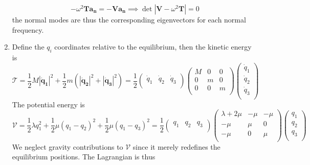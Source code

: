 \documentclass[a4paper]{article}
\begin{document}
\begin{ans}
\begin{enumerate}[label=(\roman*)]
$$-\omega^2\mathbf{Ta_n}=-\mathbf{Va_n}\implies\det|\mathbf{V}-\omega^2\mathbf{T}|=0$$
the normal modes are thus the corresponding eigenvectors for each normal frequency.
\item Define the $q_i$ coordinates relative to the equilibrium, then the kinetic energy is
$$\mathcal{T}=\frac{1}{2}M|\mathbf{\dot{q}_1}|^2+\frac{1}{2}m(|\mathbf{\dot{q}_2}|^2+|\mathbf{\dot{q}_3}|^2)=\frac{1}{2}\begin{pmatrix}\dot{q}_1&\dot{q}_2&\dot{q}_3\\\end{pmatrix}\begin{pmatrix}M&0&0\\0&m&0\\0&0&m\\\end{pmatrix}\begin{pmatrix}\dot{q}_1\\\dot{q}_2\\\dot{q}_3\\\end{pmatrix}$$
The potential energy is
$$\mathcal{V}=\frac{1}{2}\lambda q_1^2+\frac{1}{2}\mu(q_1-q_2)^2+\frac{1}{2}\mu(q_1-q_3)^2=\frac{1}{2}\begin{pmatrix}q_1&q_2&q_3\\\end{pmatrix}\begin{pmatrix}\lambda+2\mu&-\mu&-\mu\\-\mu&\mu&0\\-\mu&0&\mu\\\end{pmatrix}\begin{pmatrix}q_1\\q_2\\q_3\\\end{pmatrix}$$
We neglect gravity contributions to $\mathcal{V}$ since it merely redefines the equilibrium positions. The Lagrangian is thus

\end{enumerate}
\end{ans}
\end{document}

